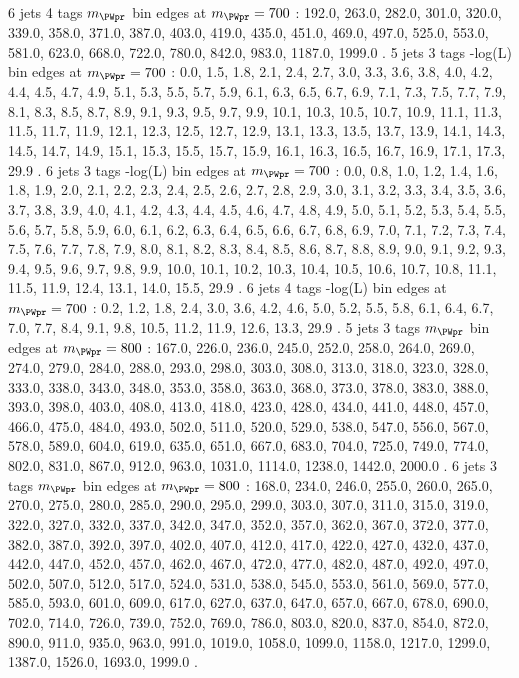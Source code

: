 6 jets 4 \Pqb tags $m_{\PWpr}$ bin edges at $m_{\PWpr}=700$ \GeV:
192.0, 263.0, 282.0, 301.0, 320.0, 339.0, 358.0, 371.0, 387.0, 403.0, 419.0, 435.0, 451.0, 469.0, 497.0, 525.0, 553.0, 581.0, 623.0, 668.0, 722.0, 780.0, 842.0, 983.0, 1187.0, 1999.0 .
5 jets 3 \Pqb tags -log(L) bin edges at $m_{\PWpr}=700$ \GeV:
0.0, 1.5, 1.8, 2.1, 2.4, 2.7, 3.0, 3.3, 3.6, 3.8, 4.0, 4.2, 4.4, 4.5, 4.7, 4.9, 5.1, 5.3, 5.5, 5.7, 5.9, 6.1, 6.3, 6.5, 6.7, 6.9, 7.1, 7.3, 7.5, 7.7, 7.9, 8.1, 8.3, 8.5, 8.7, 8.9, 9.1, 9.3, 9.5, 9.7, 9.9, 10.1, 10.3, 10.5, 10.7, 10.9, 11.1, 11.3, 11.5, 11.7, 11.9, 12.1, 12.3, 12.5, 12.7, 12.9, 13.1, 13.3, 13.5, 13.7, 13.9, 14.1, 14.3, 14.5, 14.7, 14.9, 15.1, 15.3, 15.5, 15.7, 15.9, 16.1, 16.3, 16.5, 16.7, 16.9, 17.1, 17.3, 29.9 .
6 jets 3 \Pqb tags -log(L) bin edges at $m_{\PWpr}=700$ \GeV:
0.0, 0.8, 1.0, 1.2, 1.4, 1.6, 1.8, 1.9, 2.0, 2.1, 2.2, 2.3, 2.4, 2.5, 2.6, 2.7, 2.8, 2.9, 3.0, 3.1, 3.2, 3.3, 3.4, 3.5, 3.6, 3.7, 3.8, 3.9, 4.0, 4.1, 4.2, 4.3, 4.4, 4.5, 4.6, 4.7, 4.8, 4.9, 5.0, 5.1, 5.2, 5.3, 5.4, 5.5, 5.6, 5.7, 5.8, 5.9, 6.0, 6.1, 6.2, 6.3, 6.4, 6.5, 6.6, 6.7, 6.8, 6.9, 7.0, 7.1, 7.2, 7.3, 7.4, 7.5, 7.6, 7.7, 7.8, 7.9, 8.0, 8.1, 8.2, 8.3, 8.4, 8.5, 8.6, 8.7, 8.8, 8.9, 9.0, 9.1, 9.2, 9.3, 9.4, 9.5, 9.6, 9.7, 9.8, 9.9, 10.0, 10.1, 10.2, 10.3, 10.4, 10.5, 10.6, 10.7, 10.8, 11.1, 11.5, 11.9, 12.4, 13.1, 14.0, 15.5, 29.9 .
6 jets 4 \Pqb tags -log(L) bin edges at $m_{\PWpr}=700$ \GeV:
0.2, 1.2, 1.8, 2.4, 3.0, 3.6, 4.2, 4.6, 5.0, 5.2, 5.5, 5.8, 6.1, 6.4, 6.7, 7.0, 7.7, 8.4, 9.1, 9.8, 10.5, 11.2, 11.9, 12.6, 13.3, 29.9 .
5 jets 3 \Pqb tags $m_{\PWpr}$ bin edges at $m_{\PWpr}=800$ \GeV:
167.0, 226.0, 236.0, 245.0, 252.0, 258.0, 264.0, 269.0, 274.0, 279.0, 284.0, 288.0, 293.0, 298.0, 303.0, 308.0, 313.0, 318.0, 323.0, 328.0, 333.0, 338.0, 343.0, 348.0, 353.0, 358.0, 363.0, 368.0, 373.0, 378.0, 383.0, 388.0, 393.0, 398.0, 403.0, 408.0, 413.0, 418.0, 423.0, 428.0, 434.0, 441.0, 448.0, 457.0, 466.0, 475.0, 484.0, 493.0, 502.0, 511.0, 520.0, 529.0, 538.0, 547.0, 556.0, 567.0, 578.0, 589.0, 604.0, 619.0, 635.0, 651.0, 667.0, 683.0, 704.0, 725.0, 749.0, 774.0, 802.0, 831.0, 867.0, 912.0, 963.0, 1031.0, 1114.0, 1238.0, 1442.0, 2000.0 .
6 jets 3 \Pqb tags $m_{\PWpr}$ bin edges at $m_{\PWpr}=800$ \GeV:
168.0, 234.0, 246.0, 255.0, 260.0, 265.0, 270.0, 275.0, 280.0, 285.0, 290.0, 295.0, 299.0, 303.0, 307.0, 311.0, 315.0, 319.0, 322.0, 327.0, 332.0, 337.0, 342.0, 347.0, 352.0, 357.0, 362.0, 367.0, 372.0, 377.0, 382.0, 387.0, 392.0, 397.0, 402.0, 407.0, 412.0, 417.0, 422.0, 427.0, 432.0, 437.0, 442.0, 447.0, 452.0, 457.0, 462.0, 467.0, 472.0, 477.0, 482.0, 487.0, 492.0, 497.0, 502.0, 507.0, 512.0, 517.0, 524.0, 531.0, 538.0, 545.0, 553.0, 561.0, 569.0, 577.0, 585.0, 593.0, 601.0, 609.0, 617.0, 627.0, 637.0, 647.0, 657.0, 667.0, 678.0, 690.0, 702.0, 714.0, 726.0, 739.0, 752.0, 769.0, 786.0, 803.0, 820.0, 837.0, 854.0, 872.0, 890.0, 911.0, 935.0, 963.0, 991.0, 1019.0, 1058.0, 1099.0, 1158.0, 1217.0, 1299.0, 1387.0, 1526.0, 1693.0, 1999.0 .

